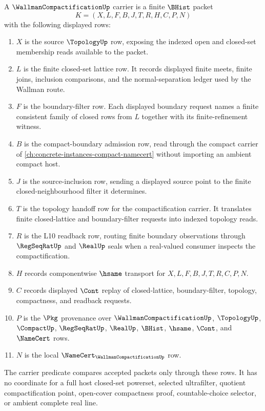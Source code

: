 \begin{definition}
\label{def:wallman-compactification-carrier}
A $\WallmanCompactificationUp$ carrier is a finite $\BHist$ packet
$$
K=(X,L,F,B,J,T,R,H,C,P,N)
$$
with the following displayed rows:
\begin{enumerate}
\item $X$ is the source $\TopologyUp$ row, exposing the indexed open and closed-set membership reads available to the packet.
\item $L$ is the finite closed-set lattice row. It records displayed finite meets, finite joins, inclusion comparisons, and the normal-separation ledger used by the Wallman route.
\item $F$ is the boundary-filter row. Each displayed boundary request names a finite consistent family of closed rows from $L$ together with its finite-refinement witness.
\item $B$ is the compact-boundary admission row, read through the compact carrier of \autoref{ch:concrete-instances-compact-namecert} without importing an ambient compact host.
\item $J$ is the source-inclusion row, sending a displayed source point to the finite closed-neighbourhood filter it determines.
\item $T$ is the topology handoff row for the compactification carrier. It translates finite closed-lattice and boundary-filter requests into indexed topology reads.
\item $R$ is the L10 readback row, routing finite boundary observations through $\RegSeqRatUp$ and $\RealUp$ seals when a real-valued consumer inspects the compactification.
\item $H$ records componentwise $\hsame$ transport for $X,L,F,B,J,T,R,C,P,N$.
\item $C$ records displayed $\Cont$ replay of closed-lattice, boundary-filter, topology, compactness, and readback requests.
\item $P$ is the $\Pkg$ provenance over $\WallmanCompactificationUp$, $\TopologyUp$, $\CompactUp$, $\RegSeqRatUp$, $\RealUp$, $\BHist$, $\hsame$, $\Cont$, and $\NameCert$ rows.
\item $N$ is the local $\NameCert_{\WallmanCompactificationUp}$ row.
\end{enumerate}
The carrier predicate compares accepted packets only through these rows. It has no coordinate for a full host closed-set powerset, selected ultrafilter, quotient compactification point, open-cover compactness proof, countable-choice selector, or ambient complete real line.
\end{definition}


